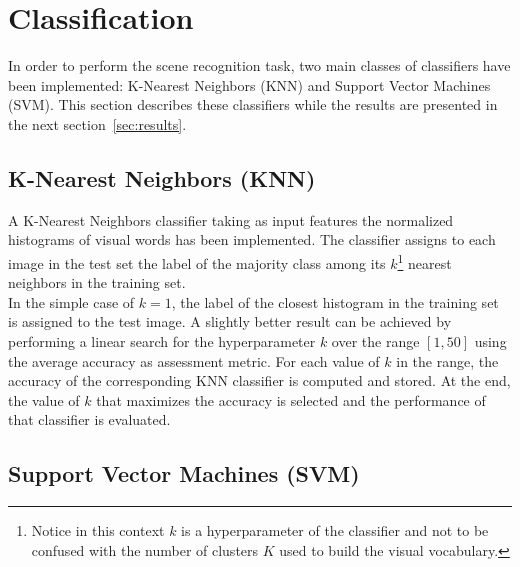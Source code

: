 \documentclass[../main.tex]{subfiles}
\begin{document}
\section{Classification}\label{sec:classification}

In order to perform the scene recognition task, two main classes of classifiers have been implemented: K-Nearest Neighbors (KNN) and Support Vector Machines (SVM). This section describes these classifiers while the results are presented in the next section~\ref{sec:results}.\\

\subsection{K-Nearest Neighbors (KNN)}\label{subsec:knn}

A K-Nearest Neighbors classifier taking as input features the normalized histograms of visual words has been implemented. The classifier assigns to each image in the test set the label of the majority class among its $k$\footnote{Notice in this context $k$ is a hyperparameter of the classifier and not to be confused with the number of clusters $K$ used to build the visual vocabulary.} nearest neighbors in the training set.\\
In the simple case of $k=1$, the label of the closest histogram in the training set is assigned to the test image. 
A slightly better result can be achieved by performing a linear search for the hyperparameter $k$ over the range $[1, 50]$ using the average accuracy as assessment metric. For each value of $k$ in the range, the accuracy of the corresponding KNN classifier is computed and stored. At the end, the value of $k$ that maximizes the accuracy is selected and the performance of that classifier is evaluated. 

\subsection{Support Vector Machines (SVM)}\label{subsec:svm}
\end{document}
